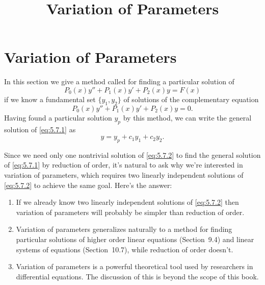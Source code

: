 \documentclass{ximera}
\title{Variation of Parameters}
\begin{document}
\begin{abstract}

\end{abstract}

\maketitle

\section*{Variation of Parameters}

In this section we give a method called  for finding a particular solution of
\begin{equation} \label{eq:5.7.1}
P_0(x)y''+P_1(x)y'+P_2(x)y=F(x)
\end{equation}
if we know a fundamental set $\{y_1,y_2\}$ of solutions of  the
complementary equation
\begin{equation} \label{eq:5.7.2}
P_0(x)y''+P_1(x)y'+P_2(x)y=0.
\end{equation}
Having found a particular solution $y_p$ by this method, we can write
the general solution of \eqref{eq:5.7.1} as
$$
y=y_p+c_1y_1+c_2y_2.
$$

Since we need only one nontrivial solution of \eqref{eq:5.7.2} to find the
general solution of \eqref{eq:5.7.1} by reduction of order, it's natural
to ask why we're interested in variation of parameters, which requires
two linearly independent solutions of \eqref{eq:5.7.2} to achieve the same
goal. Here's the answer:

\begin{enumerate}
\item If we already know two linearly independent solutions of
\eqref{eq:5.7.2} then  variation of parameters will probably  be simpler
than reduction of order.

\item Variation of parameters generalizes naturally to a method
for finding particular solutions of higher order
linear equations (Section~9.4) and  linear systems of
equations
(Section~10.7), while reduction of order doesn't.

\item Variation of parameters is a powerful theoretical tool
 used by researchers in differential equations. The discussion of this is beyond the scope of this book.
 
 \end{enumerate}
\end{document}
